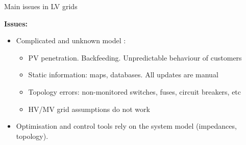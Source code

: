 \documentclass[../main.tex]{subfiles}
\begin{document}
\begin{frame}[t]{Main issues in LV grids}
{
\textbf{Issues:}
\begin{itemize}
\item<2-> Complicated and unknown model \cite{mokhtar2018automated}: 
\begin{itemize}
\item<2-> PV penetration. Backfeeding. Unpredictable behaviour of customers
\item<3-> Static information: maps, databases. All updates are manual
\item<4-> Topology errors: non-monitored switches, fuses, circuit breakers, etc
\item<5-> HV/MV grid assumptions do not work
\end{itemize}
\item<6-> Optimisation and control tools rely on the system model (impedances, topology).
\end{itemize}
}
\end{frame}


%
%


\end{document}
